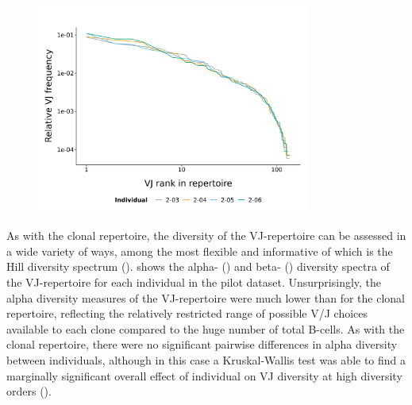 \begin{figure}
\centering
\includegraphics[width=0.8\textwidth]{_Figures/png/pilot-vj-rank-frequency}
\label{fig:igseq-pilot-vj-rank-frequency}
\end{figure}

As with the clonal repertoire, the diversity of the VJ-repertoire can be assessed in a wide variety of ways, among the most flexible and informative of which is the Hill diversity spectrum ().  shows the alpha- () and beta- () diversity spectra of the VJ-repertoire for each individual in the pilot dataset. Unsurprisingly, the alpha diversity measures of the VJ-repertoire were much lower than for the clonal repertoire, reflecting the relatively restricted range of possible V/J choices available to each clone compared to the huge number of total \naive B-cells. As with the clonal repertoire, there were no significant pairwise differences in alpha diversity between individuals, although in this case a Kruskal-Wallis test was able to find a marginally significant overall effect of individual on VJ diversity at high diversity orders (). 

